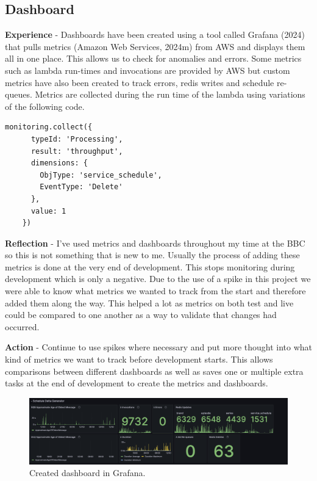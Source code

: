   \newpage
  \subsection{Dashboard}

  \textbf{Experience} - Dashboards have been created using a tool called Grafana (2024) that pulls metrics (Amazon Web Services, 2024m) from AWS and
  displays them all in one place. This allows us to check for anomalies and errors. Some metrics such as lambda run-times and invocations are provided by 
  AWS but custom metrics have also been created to track errors, redis writes and schedule re-queues. Metrics are collected during the run time of the 
  lambda using variations of the following code.

   \begin{lstlisting}[caption=Code used to update a metric\, this variation tracks a schedule delete.]
    monitoring.collect({
      typeId: 'Processing',
      result: 'throughput',
      dimensions: {
        ObjType: 'service_schedule',
        EventType: 'Delete'
      },
      value: 1
    })
  \end{lstlisting}

  \textbf{Reflection} - I've used metrics and dashboards throughout my time at the BBC so this is not something that is new to me. Usually the process of 
  adding these metrics is done at the very end of development. This stops monitoring during development which is only a negative. Due to the use of a spike 
  in this project we were able to know what metrics we wanted to track from the start and therefore added them along the way. This helped a lot as metrics on 
  both test and live could be compared to one another as a way to validate that changes had occurred.
  
  \vspace{0.2cm}
  \textbf{Action} - Continue to use spikes where necessary and put more thought into what kind of metrics we want to track before development starts.
  This allows comparisons between different dashboards as well as saves one or multiple extra tasks at the end of development to create the metrics and
  dashboards.

  \begin{figure}[H]
    \centering
    \includegraphics[width=12cm]{assets/outputs/dashboard.png}
    \caption{Created dashboard in Grafana.}
    \label{fig:dashboard}
  \end{figure}
  
